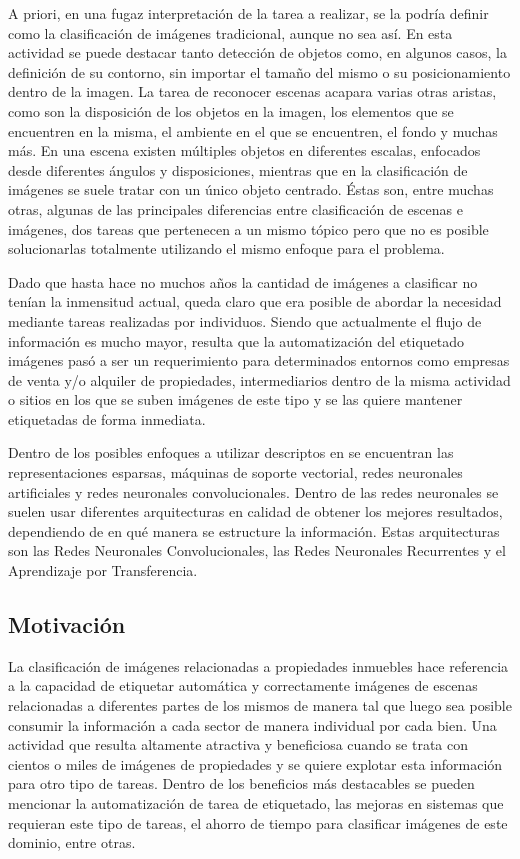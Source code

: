 A priori, en una fugaz interpretación de la tarea a realizar, se la podría definir como la clasificación de imágenes tradicional, aunque no sea así. En esta actividad se puede destacar tanto detección de objetos como, en algunos casos, la definición de su contorno, sin importar el tamaño del mismo o su posicionamiento dentro de la imagen. La tarea de reconocer escenas acapara varias otras aristas, como son la disposición de los objetos en la imagen, los elementos que se encuentren en la misma, el ambiente en el que se encuentren, el fondo y muchas más. En una escena existen múltiples objetos en diferentes escalas, enfocados desde diferentes ángulos y disposiciones, mientras que en la clasificación de imágenes se suele tratar con un único objeto centrado. Éstas son, entre muchas otras, algunas de las principales diferencias entre clasificación de escenas e imágenes, dos tareas que pertenecen a un mismo tópico pero que no es posible solucionarlas totalmente utilizando el mismo enfoque para el problema.

Dado que hasta hace no muchos años la cantidad de imágenes a clasificar no tenían la inmensitud actual, queda claro que era posible de abordar la necesidad mediante tareas realizadas por individuos. Siendo que actualmente el flujo de información es mucho mayor, resulta que la automatización del etiquetado imágenes pasó a ser un requerimiento para determinados entornos como empresas de venta y/o alquiler de propiedades, intermediarios dentro de la misma actividad o sitios en los que se suben imágenes de este tipo y se las quiere mantener etiquetadas de forma inmediata.

Dentro de los posibles enfoques a utilizar descriptos en \cite{comparation_techniques} se encuentran las representaciones esparsas, máquinas de soporte vectorial, redes neuronales artificiales y redes neuronales convolucionales. Dentro de las redes neuronales se suelen usar diferentes arquitecturas en calidad de obtener los mejores resultados, dependiendo de en qué manera se estructure la información. Estas arquitecturas son las Redes Neuronales Convolucionales, las Redes Neuronales Recurrentes y el Aprendizaje por Transferencia.


\subsection{Motivación}

La clasificación de imágenes relacionadas a propiedades inmuebles hace referencia a la capacidad de etiquetar automática y correctamente imágenes de escenas relacionadas a diferentes partes de los mismos de manera tal que luego sea posible consumir la información a cada sector de manera individual por cada bien. 
Una actividad que resulta altamente atractiva y beneficiosa cuando se trata con cientos o miles de imágenes de propiedades y se quiere explotar esta información para otro tipo de tareas. Dentro de los beneficios más destacables se pueden mencionar la automatización de tarea de etiquetado, las mejoras en sistemas que requieran este tipo de tareas, el ahorro de tiempo para clasificar imágenes de este dominio, entre otras.

